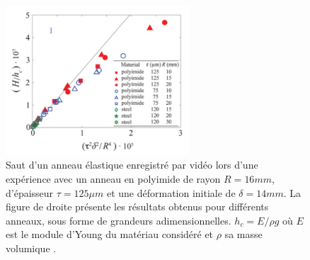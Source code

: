 \begin{figure}[h]
\includegraphics[width=260]{images_autres/ykres.png}
\caption{Saut d'un anneau élastique enregistré par vidéo lors d'une expérience avec un anneau en polyimide de rayon $R=16mm$, d'épaisseur $\tau=125\mu m$ et une déformation initiale de $\delta=14mm$. La figure de droite présente les résultats obtenus pour différents anneaux, sous forme de grandeurs adimensionnelles. $h_c=E/\rho g$ où $E$ est le module d'Young du matériau considéré et $\rho$ sa masse volumique \cite{yangkim}.}
\label{fig:figures}
\end{figure}